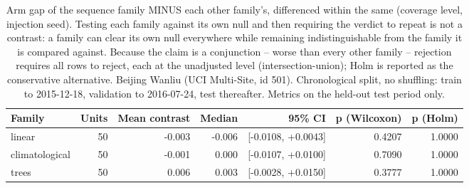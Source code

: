 \begin{table}[htbp]
\caption{Arm gap of the sequence family MINUS each other family's, differenced within the same (coverage level, injection seed). Testing each family against its own null and then requiring the verdict to repeat is not a contrast: a family can clear its own null everywhere while remaining indistinguishable from the family it is compared against. Because the claim is a conjunction -- worse than every other family -- rejection requires all rows to reject, each at the unadjusted level (intersection-union); Holm is reported as the conservative alternative. Beijing Wanliu (UCI Multi-Site, id 501). Chronological split, no shuffling: train to 2015-12-18, validation to 2016-07-24, test thereafter. Metrics on the held-out test period only.}
\label{tab:ablation_family_contrasts}
\begin{tabular}{lrrrrrr}
\toprule
Family & Units & Mean contrast & Median & 95\% CI & p (Wilcoxon) & p (Holm) \\
\midrule
linear & 50 & -0.003 & -0.006 & [-0.0108, +0.0043] & 0.4207 & 1.0000 \\
climatological & 50 & -0.001 & 0.000 & [-0.0107, +0.0100] & 0.7090 & 1.0000 \\
trees & 50 & 0.006 & 0.003 & [-0.0028, +0.0150] & 0.3777 & 1.0000 \\
\bottomrule
\end{tabular}
\end{table}
